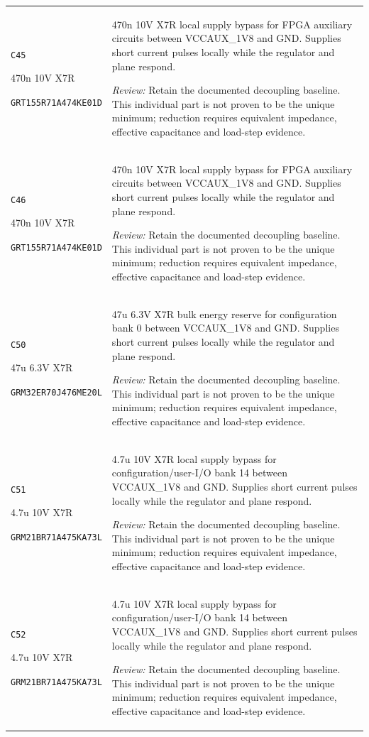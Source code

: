 \documentclass[10pt,a4paper]{article}
\begin{document}
\begin{longtable}{@{}P{46mm}P{117mm}@{}}
\nolinkurl{C45}\par 470n 10V X7R\par\scriptsize \nolinkurl{GRT155R71A474KE01D} & 470n 10V X7R local supply bypass for FPGA auxiliary circuits between VCCAUX\_1V8 and GND. Supplies short current pulses locally while the regulator and plane respond.\par\smallskip\textit{Review:} Retain the documented decoupling baseline. This individual part is not proven to be the unique minimum; reduction requires equivalent impedance, effective capacitance and load-step evidence. \\
\nolinkurl{C46}\par 470n 10V X7R\par\scriptsize \nolinkurl{GRT155R71A474KE01D} & 470n 10V X7R local supply bypass for FPGA auxiliary circuits between VCCAUX\_1V8 and GND. Supplies short current pulses locally while the regulator and plane respond.\par\smallskip\textit{Review:} Retain the documented decoupling baseline. This individual part is not proven to be the unique minimum; reduction requires equivalent impedance, effective capacitance and load-step evidence. \\
\nolinkurl{C50}\par 47u 6.3V X7R\par\scriptsize \nolinkurl{GRM32ER70J476ME20L} & 47u 6.3V X7R bulk energy reserve for configuration bank 0 between VCCAUX\_1V8 and GND. Supplies short current pulses locally while the regulator and plane respond.\par\smallskip\textit{Review:} Retain the documented decoupling baseline. This individual part is not proven to be the unique minimum; reduction requires equivalent impedance, effective capacitance and load-step evidence. \\
\nolinkurl{C51}\par 4.7u 10V X7R\par\scriptsize \nolinkurl{GRM21BR71A475KA73L} & 4.7u 10V X7R local supply bypass for configuration/user-I/O bank 14 between VCCAUX\_1V8 and GND. Supplies short current pulses locally while the regulator and plane respond.\par\smallskip\textit{Review:} Retain the documented decoupling baseline. This individual part is not proven to be the unique minimum; reduction requires equivalent impedance, effective capacitance and load-step evidence. \\
\nolinkurl{C52}\par 4.7u 10V X7R\par\scriptsize \nolinkurl{GRM21BR71A475KA73L} & 4.7u 10V X7R local supply bypass for configuration/user-I/O bank 14 between VCCAUX\_1V8 and GND. Supplies short current pulses locally while the regulator and plane respond.\par\smallskip\textit{Review:} Retain the documented decoupling baseline. This individual part is not proven to be the unique minimum; reduction requires equivalent impedance, effective capacitance and load-step evidence. \\

\end{longtable}
\end{document}
